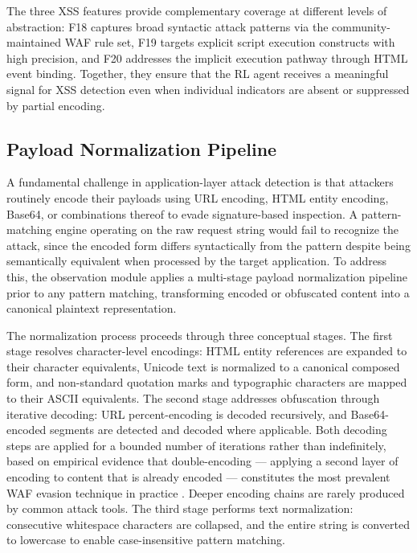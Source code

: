 \documentclass[12pt,a4paper]{report}
\begin{document}
The three XSS features provide complementary coverage at different levels of abstraction: F18 captures broad syntactic attack patterns via the community-maintained WAF rule set, F19 targets explicit script execution constructs with high precision, and F20 addresses the implicit execution pathway through HTML event binding. Together, they ensure that the RL agent receives a meaningful signal for XSS detection even when individual indicators are absent or suppressed by partial encoding.

\subsection{Payload Normalization Pipeline}

A fundamental challenge in application-layer attack detection is that attackers routinely encode their payloads using URL encoding, HTML entity encoding, Base64, or combinations thereof to evade signature-based inspection. A pattern-matching engine operating on the raw request string would fail to recognize the attack, since the encoded form differs syntactically from the pattern despite being semantically equivalent when processed by the target application. To address this, the observation module applies a multi-stage payload normalization pipeline prior to any pattern matching, transforming encoded or obfuscated content into a canonical plaintext representation.

The normalization process proceeds through three conceptual stages. The first stage resolves character-level encodings: HTML entity references are expanded to their character equivalents, Unicode text is normalized to a canonical composed form, and non-standard quotation marks and typographic characters are mapped to their ASCII equivalents. The second stage addresses obfuscation through iterative decoding: URL percent-encoding is decoded recursively, and Base64-encoded segments are detected and decoded where applicable. Both decoding steps are applied for a bounded number of iterations rather than indefinitely, based on empirical evidence that double-encoding --- applying a second layer of encoding to content that is already encoded --- constitutes the most prevalent WAF evasion technique in practice \cite{suttonBarto2018}. Deeper encoding chains are rarely produced by common attack tools. The third stage performs text normalization: consecutive whitespace characters are collapsed, and the entire string is converted to lowercase to enable case-insensitive pattern matching.
\end{document}

